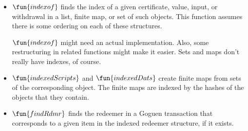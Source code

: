 \begin{itemize}
\item
  $\fun{indexof}$ finds the index of a given certificate, value, input, or
  withdrawal in a list, finite map, or set of such objects.
  This function assumes there is some ordering on each of these structures.
  \begin{note}
    $\fun{indexof}$ might need an actual implementation. Also, some
    restructuring in related functions might make it easier.
    Sets and maps don't really have indexes, of course.
  \end{note}
\item
  $\fun{indexedScripts}$ and $\fun{indexedDats}$ create finite maps from sets of the corresponding object.
  The finite maps are indexed by the hashes of the objects that they contain.
%
\item
  $\fun{findRdmr}$ finds the redeemer in a Goguen transaction
   that corresponds to a given item in the indexed redeemer structure, if it exists.
\end{itemize}


